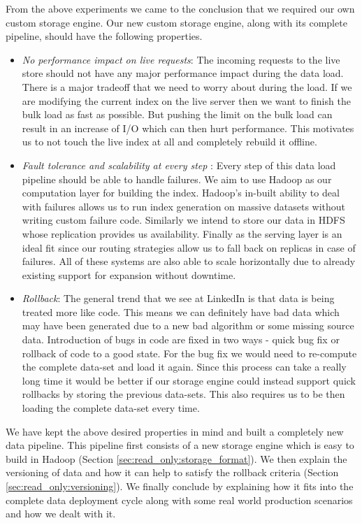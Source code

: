 \documentclass[10pt,twocolumn,preprint,nonatbib,numbers]{sigplanconf}
\begin{document}
From the above experiments we came to the conclusion that we required our own custom storage engine. Our new custom storage engine, along with its complete pipeline, should have the following properties. 
\begin{itemize}
\item \emph {No performance impact on live requests}: The incoming requests to the live store should not have any major performance impact during the data load. There is a major tradeoff that we need to worry about during the load. If we are modifying the current index on the live server then we want to finish the bulk load as fast as possible. But pushing the limit on the bulk load can result in an increase of I/O which can then hurt performance. This motivates us to not touch the live index at all and completely rebuild it offline. 
\item \emph {Fault tolerance and scalability at every step }: Every step of this data load pipeline should be able to handle failures. We aim to use Hadoop as our computation layer for building the index. Hadoop's in-built ability to deal with failures allows us to run index generation on massive datasets without writing custom failure code. Similarly we intend to store our data in HDFS whose replication provides us availability. Finally \projectname{} as the serving layer is an ideal fit since our routing strategies allow us to fall back on replicas in case of failures. All of these systems are also able to scale horizontally due to already existing support for expansion without downtime. 
\item \emph{Rollback}: The general trend that we see at LinkedIn is that data is being treated more like code. This means we can definitely have bad data which may have been generated due to a new bad algorithm or some missing source data. Introduction of bugs in code are fixed in two ways - quick bug fix or rollback of code to a good state. For the bug fix we would need to re-compute the complete data-set and load it again. Since this process can take a really long time it would be better if our storage engine could instead support quick rollbacks by storing the previous data-sets. This also requires us to be then loading the complete data-set every time. 
\end{itemize}

We have kept the above desired properties in mind and built a completely new data pipeline. This pipeline first consists of a new storage engine which is easy to build in Hadoop (Section \ref{sec:read_only:storage_format}). We then explain the versioning of data and how it can help to satisfy the rollback criteria (Section \ref{sec:read_only:versioning}). We finally conclude by explaining how it fits into the complete data deployment cycle along with some real world production scenarios and how we dealt with it. 
\end{document}

